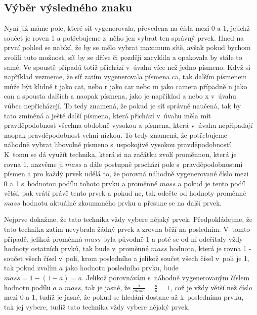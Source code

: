 \documentclass[a4paper]{article}
\begin{document}
\subsection{Výběr výsledného znaku}
Nyní již máme pole, které síť vygenerovala, převedena na čísla mezi 0 a 1, jejichž součet je roven 1 a potřebujeme z~něho jen vybrat ten správný prvek. Hned na první pohled se nabízí, že by se mělo vybrat maximum sítě, avšak pokud bychom zvolili tuto možnost, síť by se dříve či později zacyklila a opakovala by stále to samé. Ve spoustě případů totiž přichází v~úvahu více než jedno písmeno. Když si například vezmeme, že síť zatím vygenerovala písmena ca, tak dalším písmenem může být klidně t jako cat, nebo r jako car nebo m jako camera případně n jako can a spousta dalších a naopak písmena, jako je například a nebo x v~úvahu vůbec nepřicházejí. To tedy znamená, že pokud je síť správně naučená, tak by tato zmíněná a ještě další písmena, která přichází v~úvahu měla mít prav\-dě\-po\-dob\-nost všechna obdobně vysokou a písmena, která v~úvahu nepřipadají naopak pravděpodobnost velmi nízkou. To tedy znamená, že potřebujeme náhodně vybrat libovolné písmeno s~uspokojivě vysokou pravděpodobností. K~tomu se dá využít technika, která si na začátku zvolí proměnnou, která je rovna 1, nazvěme ji $mass$ a dále postupně prochází pole s~pravděpodobnostmi písmen a pro každý prvek udělá to, že porovná náhodně vygenerované číslo mezi 0 a 1 s~hodnotou podílu tohoto prvku a proměnné $mass$ a pokud je tento podíl větší, pak vrátí právě tento prvek a pokud ne, tak odečte od hodnoty proměnné $mass$ hodnotu aktuálně zkoumaného prvku a přesune se na další prvek.\par
Nejprve dokažme, že tato technika vždy vybere nějaký prvek. Předpokládejme, že tato technika zatím nevybrala žádný prvek a zrovna běží na posledním. V~tomto případě, jelikož proměnná $mass$ byla původně 1 a poté se od ní odečítaly vždy hodnoty ostatních prvků, tak bude v~proměnné $mass$ hodnota, která je rovna 1 - součet všech čísel v~poli, krom posledního a jelikož součet všech čísel v~poli je 1, tak pokud zvolím $a$ jako hodnotu posledního prvku, bude $mass = 1 - (1 - a) = a$. Jelikož porovnávám s~náhodně vygenerovaným číslem hodnotu podílu $a$ a $mass$, tak je jasné, že $\frac{a}{mass} = \frac{a}{a} = 1$, což je vždy větší než číslo mezi 0 a 1, tudíž je jasné, že pokud se hledání dostane až k~poslednímu prvku, tak jej vybere, tudíž tato technika vždy vybere nějaký prvek.\par
\end{document}

